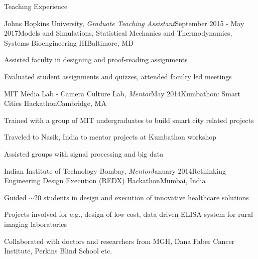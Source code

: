 \documentclass{resume}
\begin{document}
\vspace{1em}

\begin{rSection}{Teaching Experience}

\begin{rSubsection}{Johns Hopkins University, \textit{Graduate Teaching Assistant}}{September 2015 - May 2017}{Models and Simulations, Statistical Mechanics and Thermodynamics, Systems Bioengineering III}{Baltimore, MD}
\item Assisted faculty in designing and proof-reading assignments
\item Evaluated student assignments and quizzes, attended faculty led meetings
    \end{rSubsection}

\begin{rSubsection}{MIT Media Lab - Camera Culture Lab, \textit{Mentor}}{May 2014}{Kumbathon: Smart Cities Hackathon}{Cambridge, MA}
\item  Trained with a group of MIT undergraduates to build smart city related projects 
\item Traveled to Nasik, India to mentor projects at Kumbathon workshop
\item Assisted groups with signal processing and big data
    \end{rSubsection}

\begin{rSubsection}{Indian Institute of Technology Bombay, \textit{Mentor}}{January 2014}{Rethinking Engineering Design Execution (REDX) Hackathon}{Mumbai, India}
\item Guided $\sim$20 students in design and execution of innovative healthcare solutions
\item Projects involved for e.g., design of low cost, data driven ELISA system for rural imaging laboratories
\item Collaborated with doctors and researchers from MGH, Dana Faber Cancer Institute, Perkins Blind School etc.
    \end{rSubsection}

  \end{rSection}

\vspace{1em}
\end{document}
